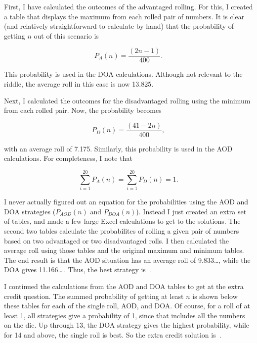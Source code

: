 \documentclass{article}
\begin{document}
First, I have calculated the outcomes of the advantaged rolling.
For this, I created a table that displays the maximum from each rolled pair of numbers.
It is clear (and relatively straightforward to calculate by hand) that the probability of getting $n$ out of this scenario is

\begin{equation*}
P_{A}(n)=\frac{(2n-1)}{400}.
\end{equation*}

This probability is used in the DOA calculations.
Although not relevant to the riddle, the average roll in this case is now 13.825.

Next, I calculated the outcomes for the disadvantaged rolling using the minimum from each rolled pair.
Now, the probability becomes

\begin{equation*}
P_{D}(n)=\frac{(41-2n)}{400},
\end{equation*}

with an average roll of 7.175.
Similarly, this probability is used in the AOD calculations.
For completeness, I note that

\begin{equation*}
\sum_{i=1}^{20}P_{A}(n)=\sum_{i=1}^{20}P_{D}(n)=1.
\end{equation*}

I never actually figured out an equation for the probabilities using the AOD and DOA strategies ($P_{AOD}(n)$ and $P_{DOA}(n)$).
Instead I just created an extra set of tables, and made a few large Excel calculations to get to the solutions.
The second two tables calculate the probabilites of rolling a given pair of numbers based on two advantaged or two disadvantaged rolls.
I then calculated the average roll using those tables and the original maximum and minimum tables.
The end result is that the AOD situation has an average roll of 9.833\dots, while the DOA gives 11.166\dots\,.
Thus, the best strategy is
\,.

I continued the calculations from the AOD and DOA tables to get at the extra credit question.
The summed probability of getting at least $n$ is shown below these tables for each of the single roll, AOD, and DOA.
Of course, for a roll of at least 1, all strategies give a probability of 1, since that includes all the numbers on the die.
Up through 13, the DOA strategy gives the highest probability, while for 14 and above, the single roll is best.
So the extra credit solution is
\,.
\end{document}
